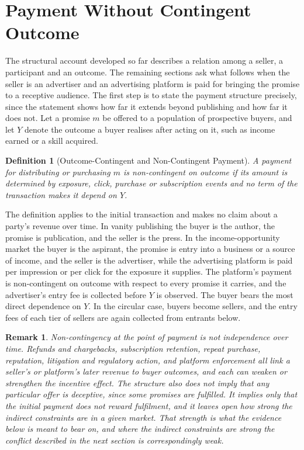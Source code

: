 \documentclass[12pt, a4paper]{article}
\newtheorem{definition}{Definition}
\newtheorem{remark}{Remark}
\begin{document}
\section{Payment Without Contingent Outcome}
\label{sec:payment}

The structural account developed so far describes a relation among a seller, a participant and an outcome. The remaining sections ask what follows when the seller is an advertiser and an advertising platform is paid for bringing the promise to a receptive audience. The first step is to state the payment structure precisely, since the statement shows how far it extends beyond publishing and how far it does not. Let a promise $m$ be offered to a population of prospective buyers, and let $Y$ denote the outcome a buyer realises after acting on it, such as income earned or a skill acquired.

\begin{definition}[Outcome-Contingent and Non-Contingent Payment]
A payment for distributing or purchasing $m$ is \emph{non-contingent on outcome} if its amount is determined by exposure, click, purchase or subscription events and no term of the transaction makes it depend on $Y$.
\end{definition}

The definition applies to the initial transaction and makes no claim about a party's revenue over time. In vanity publishing the buyer is the author, the promise is publication, and the seller is the press. In the income-opportunity market the buyer is the aspirant, the promise is entry into a business or a source of income, and the seller is the advertiser, while the advertising platform is paid per impression or per click for the exposure it supplies. The platform's payment is non-contingent on outcome with respect to every promise it carries, and the advertiser's entry fee is collected before $Y$ is observed. The buyer bears the most direct dependence on $Y$. In the circular case, buyers become sellers, and the entry fees of each tier of sellers are again collected from entrants below.

\begin{remark}
Non-contingency at the point of payment is not independence over time. Refunds and chargebacks, subscription retention, repeat purchase, reputation, litigation and regulatory action, and platform enforcement all link a seller's or platform's later revenue to buyer outcomes, and each can weaken or strengthen the incentive effect. The structure also does not imply that any particular offer is deceptive, since some promises are fulfilled. It implies only that the initial payment does not reward fulfilment, and it leaves open how strong the indirect constraints are in a given market. That strength is what the evidence below is meant to bear on, and where the indirect constraints are strong the conflict described in the next section is correspondingly weak.
\end{remark}
\end{document}
